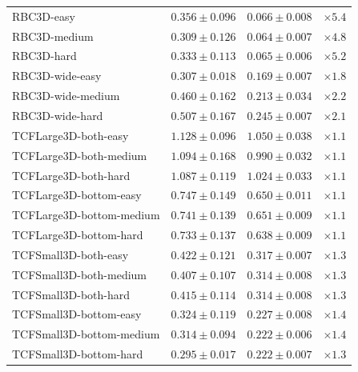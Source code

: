 \begin{tabular}{lccc}
RBC3D-easy & $0.356 \pm 0.096$ & $0.066 \pm 0.008$ & $\times5.4$ \\
RBC3D-medium & $0.309 \pm 0.126$ & $0.064 \pm 0.007$ & $\times4.8$ \\
RBC3D-hard & $0.333 \pm 0.113$ & $0.065 \pm 0.006$ & $\times5.2$ \\
RBC3D-wide-easy & $0.307 \pm 0.018$ & $0.169 \pm 0.007$ & $\times1.8$ \\
RBC3D-wide-medium & $0.460 \pm 0.162$ & $0.213 \pm 0.034$ & $\times2.2$ \\
RBC3D-wide-hard & $0.507 \pm 0.167$ & $0.245 \pm 0.007$ & $\times2.1$ \\
TCFLarge3D-both-easy & $1.128 \pm 0.096$ & $1.050 \pm 0.038$ & $\times1.1$ \\
TCFLarge3D-both-medium & $1.094 \pm 0.168$ & $0.990 \pm 0.032$ & $\times1.1$ \\
TCFLarge3D-both-hard & $1.087 \pm 0.119$ & $1.024 \pm 0.033$ & $\times1.1$ \\
TCFLarge3D-bottom-easy & $0.747 \pm 0.149$ & $0.650 \pm 0.011$ & $\times1.1$ \\
TCFLarge3D-bottom-medium & $0.741 \pm 0.139$ & $0.651 \pm 0.009$ & $\times1.1$ \\
TCFLarge3D-bottom-hard & $0.733 \pm 0.137$ & $0.638 \pm 0.009$ & $\times1.1$ \\
TCFSmall3D-both-easy & $0.422 \pm 0.121$ & $0.317 \pm 0.007$ & $\times1.3$ \\
TCFSmall3D-both-medium & $0.407 \pm 0.107$ & $0.314 \pm 0.008$ & $\times1.3$ \\
TCFSmall3D-both-hard & $0.415 \pm 0.114$ & $0.314 \pm 0.008$ & $\times1.3$ \\
TCFSmall3D-bottom-easy & $0.324 \pm 0.119$ & $0.227 \pm 0.008$ & $\times1.4$ \\
TCFSmall3D-bottom-medium & $0.314 \pm 0.094$ & $0.222 \pm 0.006$ & $\times1.4$ \\
TCFSmall3D-bottom-hard & $0.295 \pm 0.017$ & $0.222 \pm 0.007$ & $\times1.3$ \\
\bottomrule
\end{tabular}
